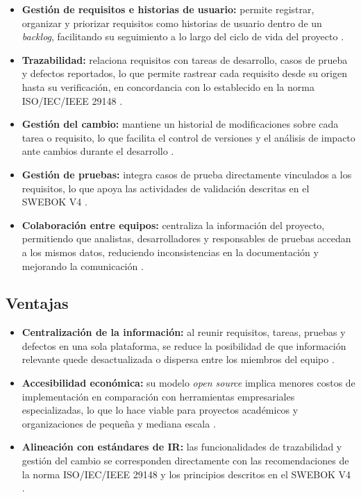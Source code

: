 \documentclass[journal,onecolumn]{IEEEtran}
\begin{document}
\begin{itemize}
  \item \textbf{Gestión de requisitos e historias de usuario:} permite registrar, organizar y
  priorizar requisitos como historias de usuario dentro de un \textit{backlog}, facilitando su
  seguimiento a lo largo del ciclo de vida del proyecto \cite{zentao2025}.

  \item \textbf{Trazabilidad:} relaciona requisitos con tareas de desarrollo, casos de prueba y
  defectos reportados, lo que permite rastrear cada requisito desde su origen hasta su verificación,
  en concordancia con lo establecido en la norma ISO/IEC/IEEE 29148 \cite{iso29148}.

  \item \textbf{Gestión del cambio:} mantiene un historial de modificaciones sobre cada tarea o
  requisito, lo que facilita el control de versiones y el análisis de impacto ante cambios durante
  el desarrollo \cite{zentao2025}.

  \item \textbf{Gestión de pruebas:} integra casos de prueba directamente vinculados a los
  requisitos, lo que apoya las actividades de validación descritas en el SWEBOK V4 \cite{swebok2024}.

  \item \textbf{Colaboración entre equipos:} centraliza la información del proyecto, permitiendo
  que analistas, desarrolladores y responsables de pruebas accedan a los mismos datos, reduciendo
  inconsistencias en la documentación y mejorando la comunicación \cite{zentao2025}.
\end{itemize}

\subsection{Ventajas}

\begin{itemize}
  \item \textbf{Centralización de la información:} al reunir requisitos, tareas, pruebas y
  defectos en una sola plataforma, se reduce la posibilidad de que información relevante quede
  desactualizada o dispersa entre los miembros del equipo \cite{zentao2025}.

  \item \textbf{Accesibilidad económica:} su modelo \textit{open source} implica menores costos
  de implementación en comparación con herramientas empresariales especializadas, lo que lo hace
  viable para proyectos académicos y organizaciones de pequeña y mediana escala \cite{zentao2025}.

  \item \textbf{Alineación con estándares de IR:} las funcionalidades de trazabilidad y gestión
  del cambio se corresponden directamente con las recomendaciones de la norma ISO/IEC/IEEE 29148
  y los principios descritos en el SWEBOK V4 \cite{iso29148, swebok2024}.
\end{itemize}
\end{document}
